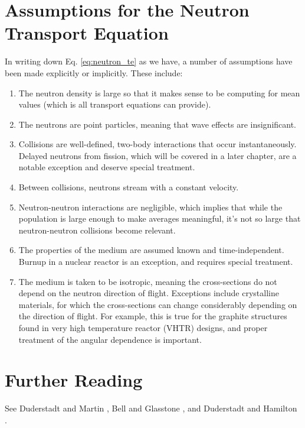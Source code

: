 \section{Assumptions for the Neutron Transport Equation}
In writing down Eq. \ref{eq:neutron_te} as we have, a number of assumptions 
have been made explicitly or implicitly.  These include:
\begin{enumerate}
   \item The neutron density is large so that it makes sense to be computing 
         for mean values (which is all transport equations can provide).
   \item The neutrons are point particles, meaning that wave effects are insignificant.
   \item Collisions are well-defined, two-body interactions that occur 
         instantaneously. Delayed neutrons from fission, which will be covered 
         in a later chapter, are a notable exception and deserve special treatment.
   \item Between collisions, neutrons stream with a constant velocity.
   \item Neutron-neutron interactions are negligible, which implies that while the 
         population is large enough to make averages meaningful, it's not so large 
         that neutron-neutron collisions become relevant. 
   \item The properties of the medium are assumed known and time-independent. 
         Burnup in a nuclear reactor is an exception, and requires special treatment.
   \item The medium is taken to be isotropic, meaning the cross-sections do not 
         depend on the neutron direction of flight.  Exceptions include crystalline 
         materials, for which the cross-sections can change considerably depending 
         on the direction of flight.  For example, this is true for the graphite 
         structures found in very high temperature reactor (VHTR) designs, 
         and proper treatment of the angular dependence is important.  
\end{enumerate}


\section{Further Reading}
See Duderstadt and Martin \cite{duderstadt1976tt},  Bell and 
Glasstone \cite{bell1970nrt}, and Duderstadt and 
Hamilton \cite{duderstadt1976nra}.